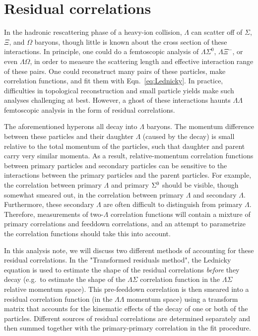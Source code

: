 \section{Residual correlations}
\label{sec:Residual}

In the hadronic rescattering phase of a heavy-ion collision, $\Lambda$ can scatter off of $\Sigma$, $\Xi$, and $\Omega$ baryons, though little is known about the cross section of these interactions.  
In principle, one could do a femtoscopic analysis of $\Lambda\Sigma^0$, $\Lambda\Xi^{-}$, or even $\Lambda\Omega$, in order to measure the scattering length and effective interaction range of these pairs. 
One could reconstruct many pairs of these particles, make correlation functions, and fit them with Eqn.\ \ref{eq:Lednicky}.
In practice, difficulties in topological reconstruction and small particle yields make such analyses challenging at best.
However, a ghost of these interactions haunts $\Lambda\Lambda$ femtoscopic analysis in the form of residual correlations.

The aforementioned hyperons all decay into $\Lambda$ baryons.  
The momentum difference between these particles and their daughter $\Lambda$ (caused by the decay) is small relative to the total momentum of the particles, such that daughter and parent carry very similar momenta.  
As a result, relative-momentum correlation functions between primary particles and secondary particles can be sensitive to the interactions between the primary particles and the parent particles.  
For example, the correlation between primary $\Lambda$ and primary $\Sigma^{\rm 0}$ should be visible, though somewhat smeared out, in the correlation between primary $\Lambda$ and secondary $\Lambda$.  
Furthermore, these secondary $\Lambda$ are often difficult to distinguish from primary $\Lambda$.  
Therefore, measurements of two-$\Lambda$ correlation functions will contain a mixture of primary correlations and feeddown correlations, and an attempt to parametrize the correlation functions should take this into account.  

In this analysis note, we will discuss two different methods of accounting for these residual correlations.  
In the "Transformed residuals method", the Lednicky equation is used to estimate the shape of the residual correlations \emph{before} they decay (e.g.\ to estimate the shape of the $\Lambda\Sigma$ correlation function in the $\Lambda\Sigma$ relative momentum space).  
This pre-feeddown correlation is then smeared into a residual correlation function (in the $\Lambda\Lambda$ momentum space) using a transform matrix that accounts for the kinematic effects of the decay of one or both of the particles.  
Different sources of residual correlations are determined separately and then summed together with the primary-primary correlation in the fit procedure.

